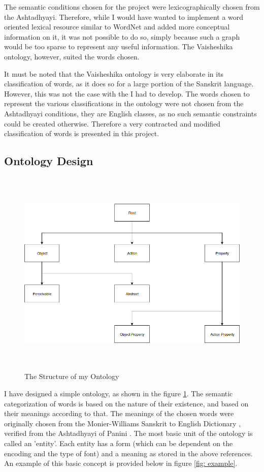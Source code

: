 \documentclass[final, 12pt]{elsarticle}
\begin{document}
The semantic conditions chosen for the project were lexicographically chosen from the Ashtadhyayi. Therefore, while I would have wanted to implement a word oriented lexical resource similar to WordNet and added more conceptual information on it, it was not possible to do so, simply because such a graph would be too sparse to represent any useful information. The Vaisheshika ontology, however, suited the words chosen.

It must be noted that the Vaisheshika ontology is very elaborate in its classification of words, as it does so for a large portion of the Sanskrit language. However, this was not the case with the I had to develop. The words chosen to represent the various classifications in the ontology were not chosen from the Ashtadhyayi conditions, they are English classes, as no such semantic constraints could be created otherwise. Therefore a very contracted and modified classification of words is presented in this project. 

\subsection{Ontology Design}

\begin{figure}
    \centering
    \includegraphics[width=13.5cm, height=10cm]{MyOntology.png}
    \caption{The Structure of my Ontology}
    \label{fig: my-ontology}
\end{figure}

I have designed a simple ontology, as shown in the figure \ref{fig: my-ontology}. The semantic categorization of words is based on the nature of their existence, and based on their meanings according to that. The meanings of the chosen words were originally chosen from the Monier-Williams Sanskrit to English Dictionary \citep{monier1964sanskrit}, verified from the Ashtadhyayi of Panini \citep{paṇini1962ashtadhyayi}. The most basic unit of the ontology is called an 'entity'. Each entity has a form (which can be dependent on the encoding and the type of font) and a meaning as stored in the above references. An example of this basic concept is provided below in figure \ref{fig: example}.
\end{document}
